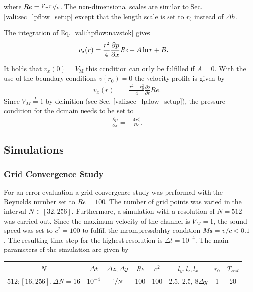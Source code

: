 where $Re = \nicefrac{V_{m}r_0}{\nu}$.
The non-dimensional scales are similar to Sec. \ref{vali:sec_lpflow_setup}  except that the length scale is set to $r_0$ instead of $\Delta h$.

The integration of Eq. \ref{vali:hpflow:navstok} gives
\begin{align}
    v_x(r) &= \frac{r^2}{4}\frac{\partial p}{\partial x}\mbox{\textit{Re}} + A \ln r + B.
\end{align}

It holds that $v_x(0)= V_{\text{M}}$ this condition can only be fulfilled if $A=0$.
With the use of the boundary conditions $v(r_0) = 0$ the velocity profile is given by
\begin{align}
    v_x(r) &= \frac{r^2 - r_0^2}{4}\frac{\partial p}{\partial x}Re.
\end{align}
Since $V_{M} \stackrel{!}{=} 1$ by definition (see Sec. \ref{vali:sec_lpflow_setup}),
 the pressure condition for the domain needs to be set to
\begin{align}
    \frac{\partial p}{\partial x} = -\frac{4 r_o^2}{Re}.
\end{align}

\subsection{Simulations}
\label{vali:hpflow_simsetups}

\subsubsection{Grid Convergence Study}

For an error evaluation a grid convergence study was performed with the Reynolds number set to $Re=100$.
The number of grid points was varied in the interval $N\in[32, 256]$. Furthermore, a
simulation with a resolution of $N=512$ was carried out.
Since the maximum velocity of the channel is $V_{M}=1$,
the sound speed was set to $c^2 = 100$ to fulfill the incompressibility condition $Ma = v/c < 0.1$.
The resulting time step for the highest resolution is $\Delta t = 10^{-4}$.
The main parameters of the simulation are  given by

\begin{center}
\vspace*{0.7ex}
\begin{tabular}{c|c|c|c|c|c|c|c }
 $ N  $                   & $\Delta t$ & $\Delta z, \Delta y$            & $\mbox{\textit{Re}}$  & $c^2$   & $l_y, l_z, l_x$ & $r_0$ & $T_{end}$\\
\hline
 $512; [16, 256], \Delta N = 16 $& $10^{-4}$ & $\nicefrac{1}{N}$ & 100     & $100$   & 2.5, 2.5, $8\Delta y$ & 1     & 20\\
\end{tabular}
\vspace*{0.7ex}
\end{center}


